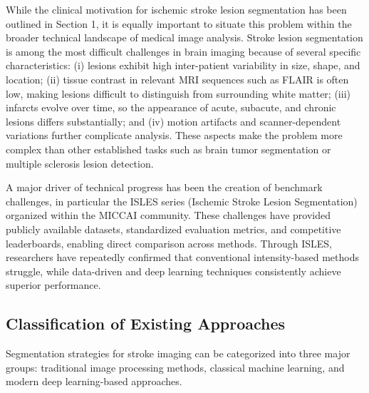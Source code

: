 \documentclass[12pt]{article}
\begin{document}
While the clinical motivation for ischemic stroke lesion segmentation has been outlined in Section 1, it is equally important to situate this problem within the broader technical landscape of medical image analysis. Stroke lesion segmentation is among the most difficult challenges in brain imaging because of several specific characteristics: (i) lesions exhibit high inter-patient variability in size, shape, and location; (ii) tissue contrast in relevant MRI sequences such as FLAIR is often low, making lesions difficult to distinguish from surrounding white matter; (iii) infarcts evolve over time, so the appearance of acute, subacute, and chronic lesions differs substantially; and (iv) motion artifacts and scanner-dependent variations further complicate analysis. These aspects make the problem more complex than other established tasks such as brain tumor segmentation or multiple sclerosis lesion detection.

A major driver of technical progress has been the creation of benchmark challenges, in particular the ISLES series (Ischemic Stroke Lesion Segmentation) organized within the MICCAI community. These challenges have provided publicly available datasets, standardized evaluation metrics, and competitive leaderboards, enabling direct comparison across methods. Through ISLES, researchers have repeatedly confirmed that conventional intensity-based methods struggle, while data-driven and deep learning techniques consistently achieve superior performance. 

\subsection{Classification of Existing Approaches} \label{subsec:classification}

Segmentation strategies for stroke imaging can be categorized into three major groups: traditional image processing methods, classical machine learning, and modern deep learning-based approaches.
\end{document}

